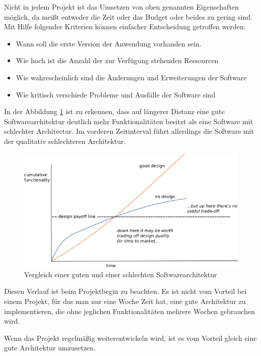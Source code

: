     Nicht in jedem Projekt ist das Umsetzen von oben genannten Eigenschaften möglich, 
    da meißt entweder die Zeit oder das Budget oder beides zu gering sind.
    Mit Hilfe folgender Kriterien können einfacher Entscheidung getroffen werden:
    \begin{itemize}
        \item Wann soll die erste Version der Anwendung vorhanden sein.
        \item Wie hoch ist die Anzahl der zur Verfügung stehenden Ressourcen
        \item Wie wahrescheinlich sind die Änderungen und Erweiterungen der Software
        \item Wie kritisch verschiede Probleme und Ausfälle der Software sind 
    \end{itemize}

    In der Abbildung \ref{fig:softQuality} ist zu erkennen, dass auf längerer Distanz eine gute Softwarearchitektur deutlich mehr Funktionalitäten 
    besitzt als eine Software mit schlechter Architectur. Im vorderen Zeitinterval führt allerdings die Software mit der qualitativ schlechteren Architektur.
    \begin{figure}[H]
        \centering
        \includegraphics[width=1\textwidth]{./images/QASoftwareCompare.png}
        \caption[Vergleich einer guten und einer schlechten Softwarearchitektur]{Vergleich einer guten und einer schlechten Softwarearchitektur \footnotemark}
        \label{fig:softQuality}
    \end{figure}
    Diesen Verlauf ist beim Projektbegin zu beachten. Es ist nicht vom Vorteil bei einem Projekt, 
    für das man nur eine Woche Zeit hat, eine gute Architektur zu implementieren, die ohne jeglichen Funktionalitäten mehrere Wochen gebrauchen wird.

    Wenn das Projekt regelmäßig weiterentwickeln wird, ist es vom Vorteil gleich eine gute Architektur umzusetzen.
